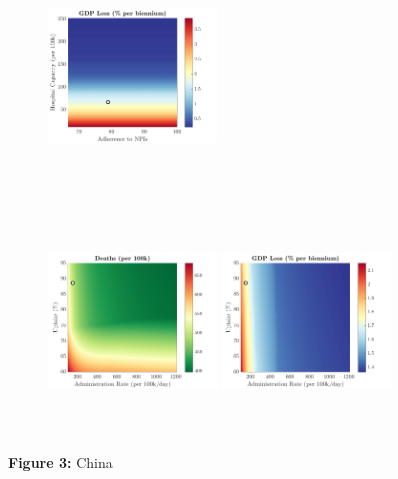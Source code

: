 \documentclass[paper=a4, fontsize=11pt]{scrartcl}
\numberwithin{figure}{section}
\numberwithin{table}{section}
\begin{document}
\begin{figure}[H]
\begin{subfigure}[b]{\textwidth}
	\hspace{0.05cm}
    	\includegraphics[width=0.49\textwidth,height=6cm]{CN/COVID/npl_g}
    \end{subfigure}
    \begin{subfigure}[b]{\textwidth}
      	\includegraphics[width=0.49\textwidth,height=6cm]{CN/COVID/imm_d}
	\hspace{0.05cm}
    	\includegraphics[width=0.49\textwidth,height=6cm]{CN/COVID/imm_g}
    \end{subfigure}
\caption*{\textbf{Figure 3:} China} 
\end{figure}
\end{document}
